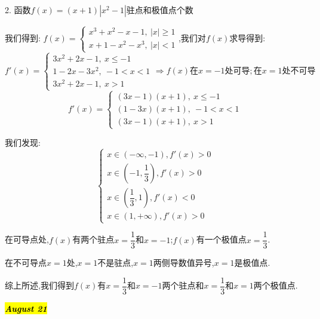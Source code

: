 2. 函数$f(x)=(x+1)|x^2-1|$驻点和极值点个数
\begin{solution}

	我们得到:  $f(x)=\left\lbrace
	\begin{array}{l}
		x^3+x^2-x-1,\ |x|\geq 1\\
		x+1-x^2-x^3,\ |x|<1
	\end{array}
	\right. $,我们对$f(x)$求导得到:
	$$f'(x)=\left\lbrace
	\begin{array}{l}
		3x^2+2x-1,\ x\leq -1\\
		1-2x-3x^2,\ -1<x<1\\
		3x^2+2x-1,\ x>1
	\end{array}
	\right. \Rightarrow f(x)\text{在}x=-1\text{处可导};\text{在}x=1\text{处不可导}$$
	$$f'(x)=\left\lbrace
	\begin{array}{l}
		(3x-1)(x+1),\ x\leq -1\\
		(1-3x)(x+1),\ -1<x<1\\
		(3x-1)(x+1),\ x>1
	\end{array}
	\right.$$
	
	我们发现:  
	$$\left\lbrace
	\begin{array}{l}
		x\in(-\infty,-1),f'(x)>0\\
		x\in(-1,\dfrac{1}{3}),f'(x)>0\\
		x\in(\dfrac{1}{3},1),f'(x)<0\\
		x\in(1,+\infty),f'(x)>0
	\end{array}
	\right. $$
	
	在可导点处,$f(x)$有两个驻点$x=\dfrac{1}{3}$和$x=-1$;$f(x)$有一个极值点$x=\dfrac{1}{3}$.
	
	在不可导点$x=1$处,$x=1$不是驻点,$x=1$两侧导数值异号,$x=1$是极值点.
	
	综上所述,我们得到$f(x)$有$x=\dfrac{1}{3}$和$x=-1$两个驻点和$x=\dfrac{1}{3}$和$x=1$两个极值点.
	
\end{solution}

\hl{\textbf{\textit{August 21}}}


